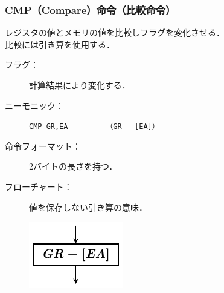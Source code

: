 \documentclass[handout]{beamer}        %
\begin{document}
\begin{frame}
  \frametitle{CMP（Compare）命令（比較命令）}
  レジスタの値とメモリの値を比較しフラグを変化させる．\\
  比較には引き算を使用する．
  \vfill
  \begin{description}
  \item[フラグ：] 計算結果により変化する．
    \vfill

  \item[ニーモニック：]\texttt{CMP GR,EA}~~~~~~~~~\texttt{（GR - [EA]）}
    \vfill

  \item[命令フォーマット：] 2バイトの長さを持つ．\\
    \vfill

  \item[フローチャート：] 値を保存しない引き算の意味．\\
    \centerline{\includegraphics[scale=0.7]{../Tikz/cmp.pdf}}
  \end{description}
  \vfill
\end{frame}
\end{document}
